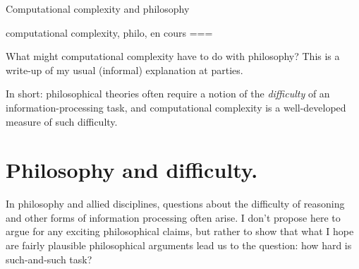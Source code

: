 Computational complexity and philosophy

computational complexity, philo, en cours
===

What might computational complexity have to do with philosophy? This is a write-up of my usual (informal) explanation at parties.

In short: philosophical theories often require a notion of the \emph{difficulty} of an information-processing task, and computational complexity is a well-developed measure of such difficulty.

\section*{Philosophy and difficulty.}
In philosophy and allied disciplines, questions about the difficulty of reasoning and other forms of information processing often arise. I don’t propose here to argue for any exciting philosophical claims, but rather to show that what I hope are fairly plausible philosophical arguments lead us to the question: how hard is such-and-such task?
